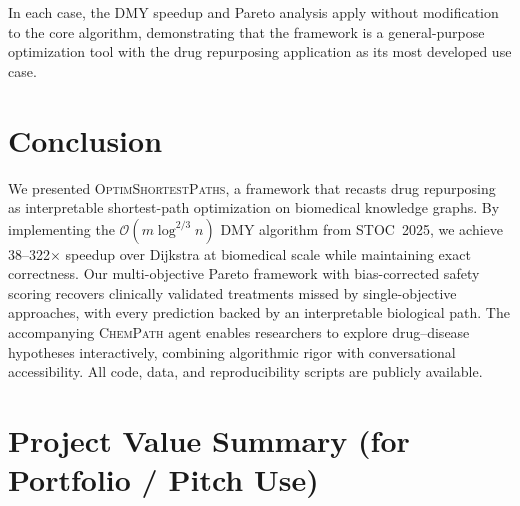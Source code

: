 \documentclass[11pt,a4paper]{article}
\newcommand{\BigO}[1]{\mathcal{O}(#1)}
\newcommand{\optim}{\textsc{OptimShortestPaths}}
\newcommand{\chempath}{\textsc{ChemPath}}
\begin{document}
In each case, the DMY speedup and Pareto analysis apply without
modification to the core algorithm, demonstrating that the
framework is a general-purpose optimization tool with the drug
repurposing application as its most developed use case.

\section{Conclusion}
\label{sec:conclusion}

We presented \optim{}, a framework that recasts drug repurposing as
interpretable shortest-path optimization on biomedical knowledge graphs.
By implementing the $\BigO{m \log^{2/3} n}$ DMY algorithm from STOC~2025,
we achieve 38--322$\times$ speedup over Dijkstra at biomedical scale
while maintaining exact correctness. Our multi-objective Pareto framework
with bias-corrected safety scoring recovers clinically validated
treatments missed by single-objective approaches, with every prediction
backed by an interpretable biological path. The accompanying
\chempath{} agent enables researchers to explore drug--disease
hypotheses interactively, combining algorithmic rigor with
conversational accessibility. All code, data, and reproducibility
scripts are publicly available.





\appendix

\section{Project Value Summary (for Portfolio / Pitch Use)}
\label{app:value}
\end{document}
